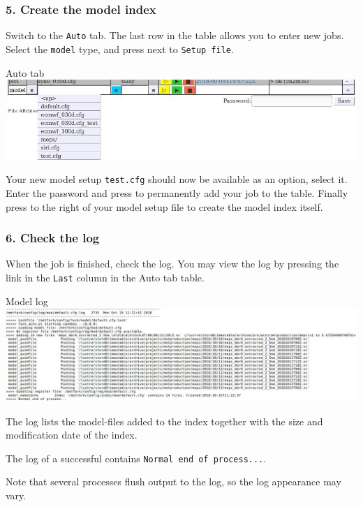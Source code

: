 \documentclass[letterpaper,10pt,twoside,twocolumn,openany]{book}
\begin{document}
{\subsubsection{5. Create the model index}
Switch to the \lstinline!Auto! tab.
The last row in the table allows you to enter new jobs.
Select the \lstinline!model! type, and press  next to \lstinline!Setup file!.
\begin{paperbox}{Auto tab}
  \includegraphics[width=\columnwidth]{how_auto.jpg}
\end{paperbox}
Your new model setup \lstinline!test.cfg! should now be available as an option, select it.
Enter the password and press 
to permanently add your job to the table.
Finally press  to the right of your model setup file to create the model index itself.

\subsubsection{6. Check the log}
When the job is finished, check the log. You may view the log by pressing the link in the \lstinline!Last! column in the Auto tab table.
\begin{paperbox}{Model log}
  \includegraphics[width=\columnwidth]{modlog.jpg}
\end{paperbox}
The log lists the model-files added to the index together with the size and modification date of the index.
\begin{quotebox}
   The log of a successful contains \lstinline!Normal end of process...!.
\end{quotebox}
Note that several processes flush output to the log, so the log appearance may vary.

}
\end{document}
